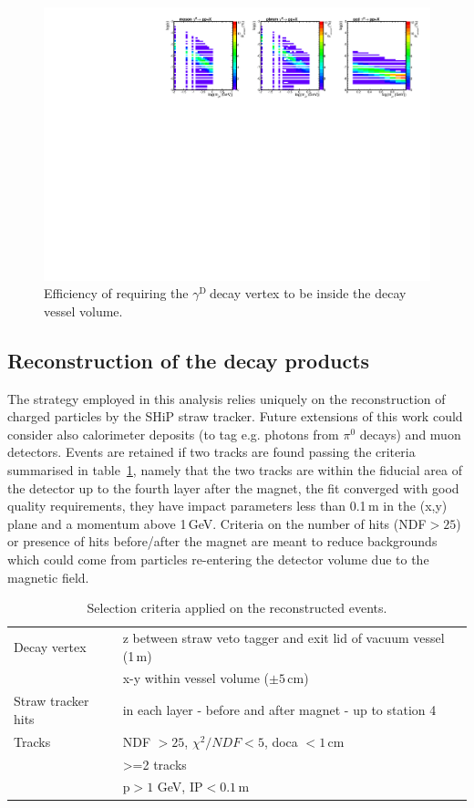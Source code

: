 \documentclass[12pt,a4paper,]{article}
\newcommand{\mathDP}{\gamma^{\mathrm{D}}\ }
\newcommand{\DP}{$\mathDP$}
\begin{document}
  \begin{figure}[h!]
  \centering
\includegraphics[width=1.\textwidth]{figures/EffVesselvs2DMassEps_all.pdf}
\caption{Efficiency of requiring the \DP decay vertex to be inside the decay vessel volume.}
\label{fig:Pvessel}
\end{figure}


\subsection{Reconstruction of the decay products}
\label{sec:reco}

The strategy employed in this analysis relies uniquely on the
reconstruction of charged particles by the SHiP straw tracker. Future
extensions of this work could consider also calorimeter deposits (to
tag e.g. photons from $\pi^0$ decays) and muon detectors. Events are
retained if two tracks are found passing the criteria summarised in
table~\ref{tab:recoSel}, namely that the two tracks are within the
fiducial area of the detector up to the fourth layer after the magnet,
the fit converged with good quality requirements, they have impact
parameters less than 0.1\,m in the (x,y) plane and a momentum above
1\,GeV. Criteria on the number of hits (NDF$>25$) or presence of hits
before/after the magnet are meant to reduce backgrounds which could
come from particles re-entering the detector volume due to the
magnetic field.

\begin{table}[thbp]
  \centering
  \begin{tabular}{|p{}|p{}|}
    \hline
    Decay vertex & z between straw veto tagger and exit lid of vacuum vessel (1\,m) \\
    & x-y within vessel volume ($\pm 5$\,cm)\\
    \hline
    Straw tracker hits & in each layer - before and after magnet - up to station 4 \\
    \hline
    Tracks & NDF $> 25$, $\chi^2 / NDF < 5$, doca $<1$\,cm \\
    & >=2 tracks \\
    & p$>1$ GeV, IP$<0.1$\,m \\
\hline
\end{tabular}
  \caption{Selection criteria applied on the reconstructed events.}
  \label{tab:recoSel}
\end{table}
\end{document}
